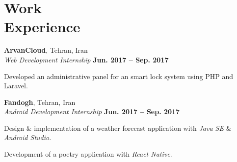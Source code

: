 \section{\sc Work \\ Experience}

{\bf ArvanCloud}, Tehran, Iran \\ 
\vspace{0.1cm}
\textit{Web Development Internship} \hfill{\textbf{Jun. 2017 -- Sep. 2017}} \\
\vspace{-0.4cm}
\begin{list2}
	\item Developed an administrative panel for an smart lock system using PHP and Laravel.
\end{list2}

{\bf Fandogh}, Tehran, Iran \\ 
\vspace{0.1cm}
\textit{Android Development Internship} \hfill{\textbf{Jun. 2017 -- Sep. 2017}} \\
\vspace{-0.4cm}
\begin{list2}
	\item Design \& implementation of a weather forecast application with \textit{Java SE} \& \textit{Android Studio}.
	\item Development of a poetry application with \textit{React Native}.
\end{list2}

\endinput